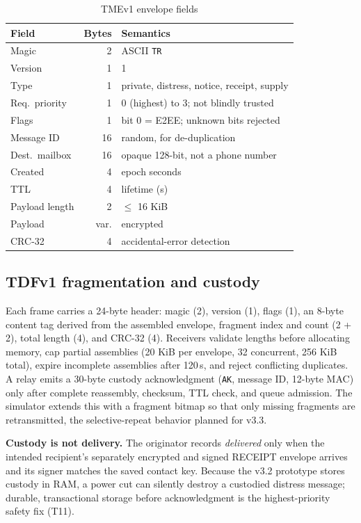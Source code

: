 \documentclass[jou,a4paper,11pt,floatsintext]{apa7}
\begin{document}
\begin{table}[t]
\caption{TMEv1 envelope fields}
\label{tab:tme}
\small
\begin{tabularx}{\linewidth}{@{}lrY@{}}
\toprule
Field & Bytes & Semantics \\
\midrule
Magic & 2 & ASCII \texttt{TR} \\
Version & 1 & 1 \\
Type & 1 & private, distress, notice, receipt, supply \\
Req.\ priority & 1 & 0 (highest) to 3; not blindly trusted \\
Flags & 1 & bit 0 = E2EE; unknown bits rejected \\
Message ID & 16 & random, for de-duplication \\
Dest.\ mailbox & 16 & opaque 128-bit, not a phone number \\
Created & 4 & epoch seconds \\
TTL & 4 & lifetime (s) \\
Payload length & 2 & $\le$ 16 KiB \\
Payload & var. & encrypted \\
CRC-32 & 4 & accidental-error detection \\
\bottomrule
\end{tabularx}
\end{table}

\subsection{TDFv1 fragmentation and custody}
Each frame carries a 24-byte header: magic (2), version (1), flags (1), an 8-byte content tag derived from the assembled envelope, fragment index and count (2 + 2), total length (4), and CRC-32 (4). Receivers validate lengths before allocating memory, cap partial assemblies (20 KiB per envelope, 32 concurrent, 256 KiB total), expire incomplete assemblies after 120\,s, and reject conflicting duplicates. A relay emits a 30-byte custody acknowledgment (\texttt{AK}, message ID, 12-byte MAC) only after complete reassembly, checksum, TTL check, and queue admission. The simulator extends this with a fragment bitmap so that only missing fragments are retransmitted, the selective-repeat behavior planned for v3.3.

\textbf{Custody is not delivery.} The originator records \emph{delivered} only when the intended recipient's separately encrypted and signed RECEIPT envelope arrives and its signer matches the saved contact key. Because the v3.2 prototype stores custody in RAM, a power cut can silently destroy a custodied distress message; durable, transactional storage before acknowledgment is the highest-priority safety fix (T11).
\end{document}
